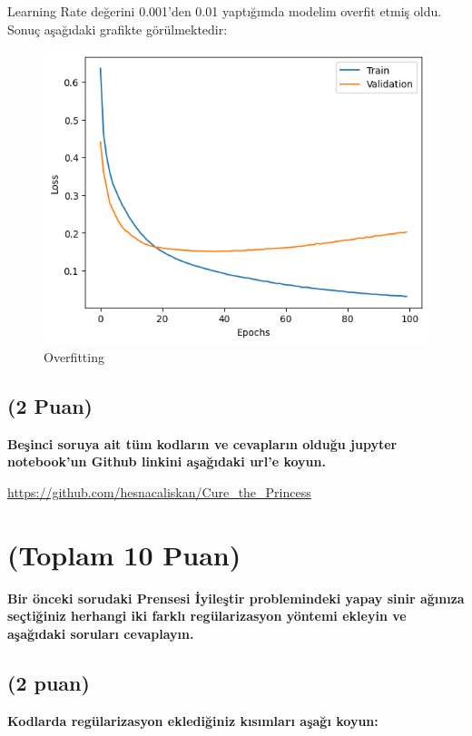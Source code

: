 \documentclass[11pt]{article}
\begin{document}
Learning Rate değerini 0.001'den 0.01 yaptığımda modelim overfit etmiş oldu. Sonuç aşağıdaki grafikte görülmektedir:


\begin{figure}[ht!]
    \centering
    \includegraphics{overfitting lr = 0.01.png}
    \caption{Overfitting}
    \label{fig:my_picl}
\end{figure}
\newpage
\subsection{(2 Puan)} \textbf{Beşinci soruya ait tüm kodların ve cevapların olduğu jupyter notebook'un Github linkini aşağıdaki url'e koyun.}

\url{https://github.com/hesnacaliskan/Cure_the_Princess}

\section{(Toplam 10 Puan)} \textbf{Bir önceki sorudaki Prensesi İyileştir problemindeki yapay sinir ağınıza seçtiğiniz herhangi iki farklı regülarizasyon yöntemi ekleyin ve aşağıdaki soruları cevaplayın.} 

\subsection{(2 puan)} \textbf{Kodlarda regülarizasyon eklediğiniz kısımları aşağı koyun:} 
\end{document}
